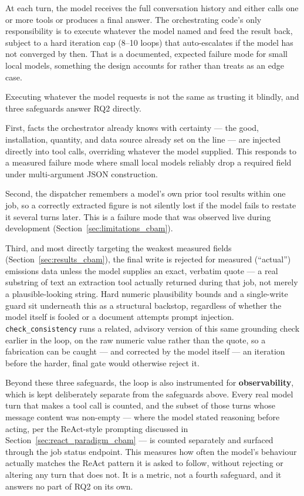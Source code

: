 At each turn, the model receives the full conversation history and
either calls one or more tools or produces a final answer. The
orchestrating code's only responsibility is to execute whatever the
model named and feed the result back, subject to a hard iteration cap
(8--10 loops) that auto-escalates if the model has not converged by
then. That is a documented, expected failure mode for small local
models, something the design accounts for rather than treats as an edge
case.

Executing whatever the model requests is not the same as trusting it
blindly, and three safeguards answer RQ2 directly.

First, facts the orchestrator already knows with certainty --- the good,
installation, quantity, and data source already set on the line --- are
injected directly into tool calls, overriding whatever the model
supplied. This responds to a measured failure mode where small local
models reliably drop a required field under multi-argument JSON
construction.

Second, the dispatcher remembers a model's own prior tool results within
one job, so a correctly extracted figure is not silently lost if the
model fails to restate it several turns later. This is a failure mode
that was observed live during development
(Section~\ref{sec:limitations_cbam}).

Third, and most directly targeting the weakest measured fields
(Section~\ref{sec:results_cbam}), the final write is rejected for
measured (``actual'') emissions data unless the model supplies an exact,
verbatim quote --- a real substring of text an extraction tool actually
returned during that job, not merely a plausible-looking string. Hard
numeric plausibility bounds and a single-write guard sit underneath this
as a structural backstop, regardless of whether the model itself is
fooled or a document attempts prompt injection.
\texttt{check\_consistency} runs a related, advisory version of this
same grounding check earlier in the loop, on the raw numeric value
rather than the quote, so a fabrication can be caught --- and corrected
by the model itself --- an iteration before the harder, final gate would
otherwise reject it.

Beyond these three safeguards, the loop is also instrumented for
\textbf{observability}, which is kept deliberately separate from the
safeguards above. Every real model turn that makes a tool call is
counted, and the subset of those turns whose message content was
non-empty --- where the model stated reasoning before acting, per the
ReAct-style prompting discussed in Section~\ref{sec:react_paradigm_cbam}
--- is counted separately and surfaced through the job status endpoint.
This measures how often the model's behaviour actually matches the
ReAct pattern it is asked to follow, without rejecting or altering any
turn that does not. It is a metric, not a fourth safeguard, and it
answers no part of RQ2 on its own.

